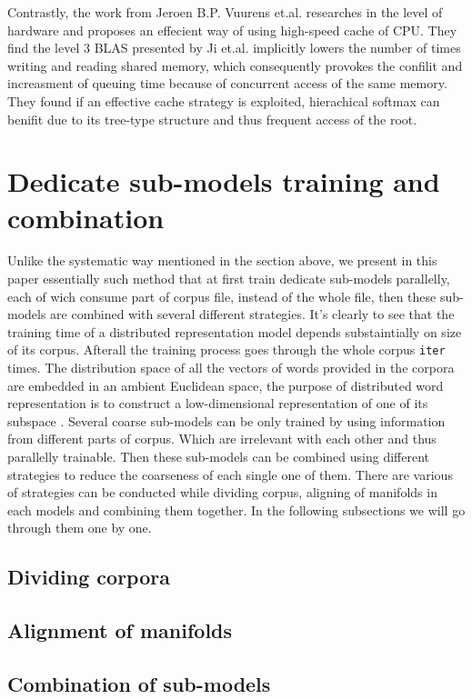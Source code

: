 \documentclass[11pt,a4paper]{article}
\begin{document}
Contrastly, the work from Jeroen B.P. Vuurens et.al. \cite{eickhoff2016efficient} researches in the level of hardware and proposes an effecient way of using high-speed cache of CPU. They find the level 3 BLAS presented by Ji et.al. implicitly lowers the number of times writing and reading shared memory, which consequently provokes the confilit and increasment of queuing time because of concurrent access of the same memory. They found if an effective cache strategy is exploited, hierachical softmax can benifit due to its tree-type structure and  thus frequent access of the root.

\section{Dedicate sub-models training and combination}
Unlike the systematic way mentioned in the section above, we present in this paper essentially such method that at first train dedicate sub-models parallelly, each of wich consume part of corpus file, instead of the whole file, then these sub-models are combined with several different strategies. It's clearly to see that the training time of a distributed representation model depends substaintially on size of its corpus. Afterall the training process goes through the whole corpus \verb|iter| times. The distribution space of all the vectors of words provided in the corpora are embedded in an ambient Euclidean space, the purpose of distributed word representation is to construct a low-dimensional representation of one of its subspace \cite{Mahadevan2015reasoning}. Several coarse sub-models can be only trained by using information from different parts of corpus. Which are irrelevant with each other and thus parallelly trainable. Then these sub-models can be combined using different strategies to reduce the coarseness of each single one of them. There are various of strategies can be conducted while dividing corpus, aligning of manifolds in each models and combining them together. In the following subsections we will go through them one by one.

  \subsection{Dividing corpora}
  \subsection{Alignment of manifolds}
  \subsection{Combination of sub-models}
\end{document}
